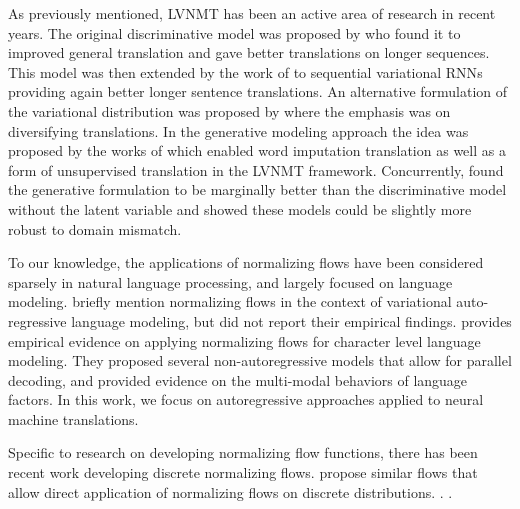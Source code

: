 As previously mentioned, \ac{LVNMT} has been an active area of research in recent years. The original discriminative model was proposed by \citet{Zhang2016VNMT} who found it to improved general translation and gave better translations on longer sequences. This model was then extended by the work of \citet{Su2018VRNMT} to sequential variational \ac{RNN}s providing again better longer sentence translations. An alternative formulation of the variational distribution was proposed by \citet{schulz2018StochasticDecoder} where the emphasis was on diversifying translations. In the generative modeling approach the idea was proposed by the works of \citet{harshil2018GNMT} which enabled word imputation translation as well as a form of unsupervised translation in the \ac{LVNMT} framework. Concurrently, \citet{eikema2018AEVNMT} found the generative formulation to be marginally better than the discriminative model without the latent variable and showed these models could be slightly more robust to domain mismatch. 

To our knowledge, the applications of normalizing flows have been considered sparsely in natural language processing, and largely focused on language modeling. \citet{bowman2015GeneratingSent} briefly mention normalizing flows in the context of variational auto-regressive language modeling, but did not report their empirical findings. \citet{ziegler2019LatentNFforDiscrete} provides empirical evidence on applying normalizing flows for character level language modeling. They proposed several non-autoregressive models that allow for parallel decoding, and provided evidence on the multi-modal behaviors of language factors. In this work, we focus on autoregressive approaches applied to neural machine translations.

Specific to research on developing normalizing flow functions, there has been recent work developing discrete normalizing flows. \cite{tran2019discreteflows,hoogeboom2019IntegerDiscreteFlows} propose similar flows that allow direct application of normalizing flows on discrete distributions. . .


